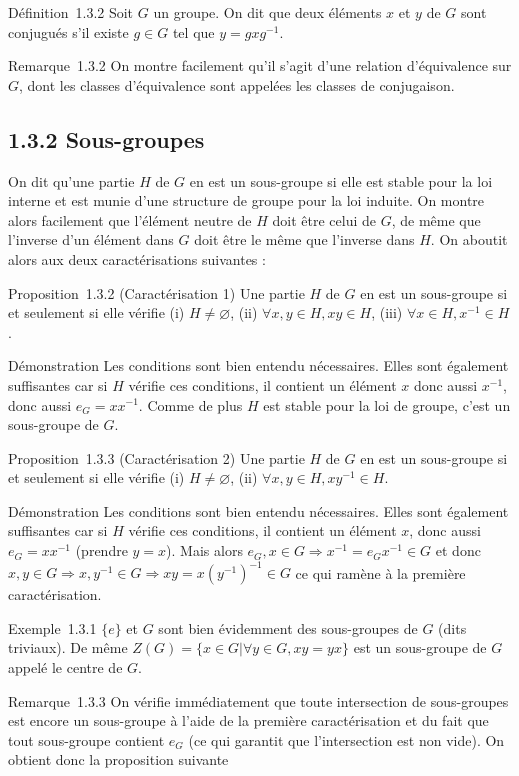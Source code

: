 Définition~1.3.2 Soit $G$ un groupe. On dit que deux éléments $x$ et $y$ de $G$
sont conjugués s'il existe $g \in G$ tel que $y = gxg^{-1}$.

Remarque~1.3.2 On montre facilement qu'il s'agit d'une relation
d'équivalence sur $G$, dont les classes d'équivalence sont appelées les
classes de conjugaison.

\subsection{1.3.2 Sous-groupes}

On dit qu'une partie $H$ de $G$ en est un sous-groupe si elle est stable
pour la loi interne et est munie d'une structure de groupe pour la loi
induite. On montre alors facilement que l'élément neutre de $H$ doit être
celui de $G$, de même que l'inverse d'un élément dans $G$ doit être le même
que l'inverse dans $H$. On aboutit alors aux deux caractérisations
suivantes :

Proposition~1.3.2 (Caractérisation 1) Une partie $H$ de $G$ en est un
sous-groupe si et seulement si elle vérifie (i)
$H \neq \varnothing$, (ii) $\forall x,y \in H,
xy \in H$, (iii) $\forall x \in H, x^{-1} \in H$.

Démonstration Les conditions sont bien entendu nécessaires. Elles sont
également suffisantes car si $H$ vérifie ces conditions, il contient un
élément $x$ donc aussi $x^{-1}$, donc aussi $e_G =
xx^{-1}$. Comme de plus $H$ est stable pour la loi de groupe,
c'est un sous-groupe de $G$.

Proposition~1.3.3 (Caractérisation 2) Une partie $H$ de $G$ en est un
sous-groupe si et seulement si elle vérifie (i)
$H \neq \varnothing$, (ii) $\forall x,y \in H,
xy^{-1} \in H$.

Démonstration Les conditions sont bien entendu nécessaires. Elles sont
également suffisantes car si $H$ vérifie ces conditions, il contient un
élément $x$, donc aussi $e_G = xx^{-1}$ (prendre $y = x$).
Mais alors $e_G, x \in G \Rightarrow x^{-1} =
e_G x^{-1} \in G$ et donc $x,y \in G \Rightarrow x,y^{-1} \in G
\Rightarrow xy = x(y^{-1})^{-1} \in G$ ce qui ramène à la première
caractérisation.

Exemple~1.3.1 $\{e\}$ et $G$ sont bien
évidemment des sous-groupes de $G$ (dits triviaux). De même $Z(G) =
\{x \in G | \forall y \in G, xy = yx\}$ est un sous-groupe de $G$ appelé le centre de $G$.

Remarque~1.3.3 On vérifie immédiatement que toute intersection de
sous-groupes est encore un sous-groupe à l'aide de la première
caractérisation et du fait que tout sous-groupe contient $e_G$
(ce qui garantit que l'intersection est non vide). On obtient donc la
proposition suivante

